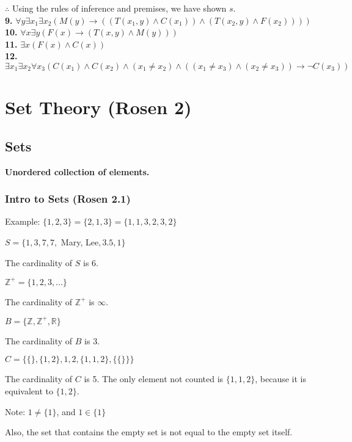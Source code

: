 \documentclass[english,openany]{book}
\begin{document}
	$\therefore$ Using the rules of inference and premises, we have shown $s$.\\

	\textbf{9.} $\forall y \exists x_1 \exists x_2 ( M(y) \rightarrow ( (T(x_1, y) \wedge C(x_1)) \wedge (T(x_2, y) \wedge F(x_2))  ))$\\

	\textbf{10.} $\forall x \exists y (F(x) \rightarrow (T(x,y) \wedge M(y)))$\\

	\textbf{11.} $\exists x (F(x) \wedge C(x))$\\

	\textbf{12.} $\exists x_1 \exists x_2  \forall x_3 ( C(x_1) \wedge C(x_2) \wedge (x_1 \neq x_2) \wedge ((x_1 \neq x_3) \wedge (x_2 \neq x_3)) \rightarrow \neg C(x_3))$


	\chapter{Set Theory (Rosen 2)}

	\section{Sets}

	\textbf{Unordered collection of elements.}

	\subsection{Intro to Sets (Rosen 2.1)}

	Example: $\{1,2,3\} = \{2,1,3\} = \{1,1,3,2,3,2\}$\newline

	$S = \{1,3,7,7,$ Mary, Lee$,3.5,1\}$

	The cardinality of $S$ is 6.

	$\mathbb Z^+ = \{ 1,2,3,... \}$

	The cardinality of $\mathbb Z^+$ is $\infty$.

	$B = \{\mathbb Z, \mathbb Z^+, \mathbb R \}$

	The cardinality of $B$ is 3.

	$C = \{ \{\}, \{1,2\},1,2,\{1,1,2 \}, \{\{\}\} \}$

	The cardinality of $C$ is 5. The only element not counted is $\{1,1,2 \}$, because it is equivalent to $\{1,2\}$.

	Note: $1 \neq \{1\}$, and $1 \in \{1\}$

	Also, the set that contains the empty set is not equal to the empty set itself.
\end{document}

